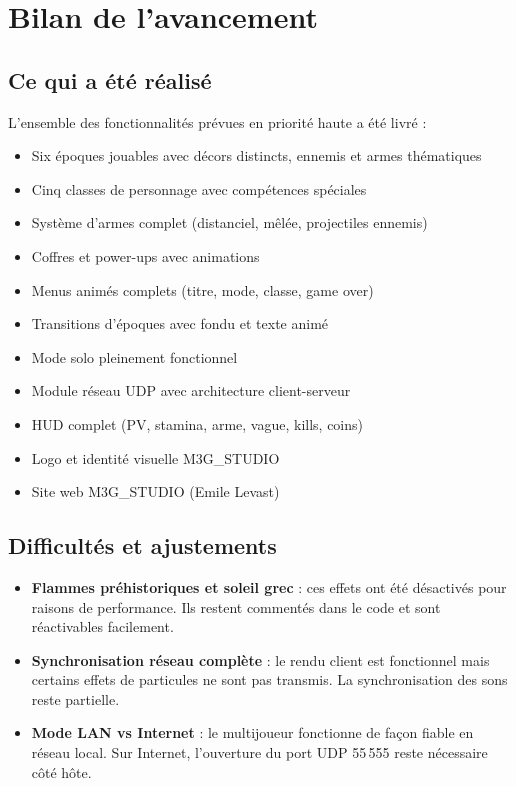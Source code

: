 \documentclass[12pt,a4paper]{article}
\newcommand{\okitem}{\textcolor{okgreen}{$\checkmark$}}
\begin{document}
\section{Bilan de l'avancement}

\subsection{Ce qui a été réalisé}

L'ensemble des fonctionnalités prévues en priorité haute a été livré :

\begin{itemize}[leftmargin=1.8em, itemsep=2pt]
  \item[\okitem] Six époques jouables avec décors distincts, ennemis et armes thématiques
  \item[\okitem] Cinq classes de personnage avec compétences spéciales
  \item[\okitem] Système d'armes complet (distanciel, mêlée, projectiles ennemis)
  \item[\okitem] Coffres et power-ups avec animations
  \item[\okitem] Menus animés complets (titre, mode, classe, game over)
  \item[\okitem] Transitions d'époques avec fondu et texte animé
  \item[\okitem] Mode solo pleinement fonctionnel
  \item[\okitem] Module réseau UDP avec architecture client-serveur
  \item[\okitem] HUD complet (PV, stamina, arme, vague, kills, coins)
  \item[\okitem] Logo et identité visuelle M3G\_STUDIO
  \item[\okitem] Site web M3G\_STUDIO (Emile Levast)
\end{itemize}

\subsection{Difficultés et ajustements}

\begin{itemize}[leftmargin=1.5em, itemsep=4pt]
  \item \textbf{Flammes préhistoriques et soleil grec} : ces effets ont été désactivés pour raisons de performance. Ils restent commentés dans le code et sont réactivables facilement.
  \item \textbf{Synchronisation réseau complète} : le rendu client est fonctionnel mais certains effets de particules ne sont pas transmis. La synchronisation des sons reste partielle.
  \item \textbf{Mode LAN vs Internet} : le multijoueur fonctionne de façon fiable en réseau local. Sur Internet, l'ouverture du port UDP 55\,555 reste nécessaire côté hôte.
\end{itemize}
\end{document}
